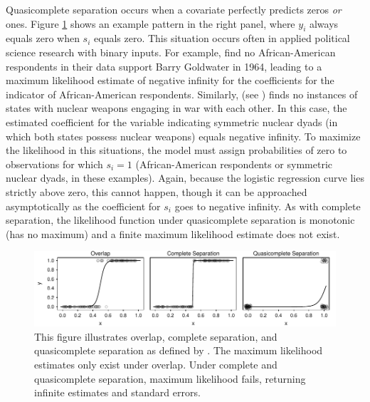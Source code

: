 \documentclass[12pt]{article}
\begin{document}
Quasicomplete separation occurs when a covariate perfectly predicts zeros \textit{or} ones. Figure \ref{fig:illustrating_separation} shows an example pattern in the right panel, where $y_i$ always equals zero when $s_i$ equals zero. This situation occurs often in applied political science research with binary inputs. For example, \cite{Gelmanetal2008} find no African-American respondents in their data support Barry Goldwater in 1964, leading to a maximum likelihood estimate of negative infinity for the coefficients for the indicator of African-American respondents. Similarly, \cite{Rauchhaus2009} (see \citealt{BellMiller2014}) finds no instances of states with nuclear weapons engaging in war with each other. In this case, the estimated coefficient for the variable indicating symmetric nuclear dyads (in which both states possess nuclear weapons) equals negative infinity. To maximize the likelihood in this situations, the model must assign probabilities of zero to observations for which $s_i = 1$ (African-American respondents or symmetric nuclear dyads, in these examples). Again, because the logistic regression curve lies strictly above zero, this cannot happen, though it can be approached asymptotically as the coefficient for $s_i$ goes to negative infinity. As with complete separation, the likelihood function under quasicomplete separation is monotonic (has no maximum) and a finite maximum likelihood estimate does not exist.

\begin{figure}[H]
\begin{center}
\includegraphics[scale = 1]{figs/illustrate-separation.pdf}
\end{center}
\caption{This figure illustrates overlap, complete separation, and quasicomplete separation as defined by \cite{AlbertAnderson1984}. The maximum likelihood estimates only exist under overlap. Under complete and quasicomplete separation, maximum likelihood fails, returning infinite estimates and standard errors.}\label{fig:illustrating_separation}
\end{figure}
\end{document}
